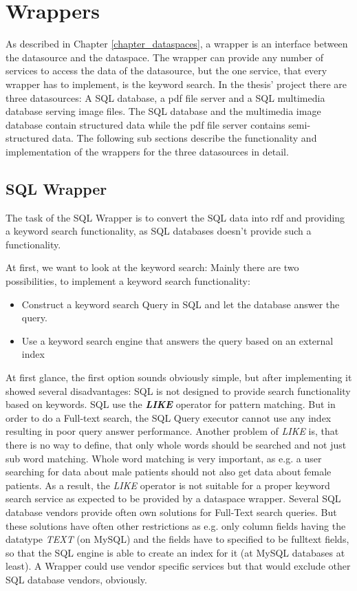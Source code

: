 \section{Wrappers}

As described in Chapter \ref{chapter_dataspaces}, a wrapper is  an interface between the datasource and the dataspace. The wrapper can provide any number of services to access the data of the datasource, but the one service, that every wrapper has to implement, is the keyword search.
In the thesis' project there are three datasources: A SQL database, a pdf file server and a SQL multimedia database serving image files. The SQL database and the multimedia image database contain
structured data while the pdf file server contains semi-structured data.
The following sub sections describe the functionality and implementation of the wrappers for the three datasources in detail.

\subsection{SQL Wrapper}

The task of the SQL Wrapper is to convert the SQL data into rdf and providing a keyword search functionality, as SQL databases doesn't provide such a functionality.

At first, we want to look at the keyword search:
Mainly there are two possibilities, to implement a keyword search functionality:
\begin{itemize}
	\item {Construct a keyword search Query in SQL and let the database answer the query.}
	
	\item {Use a keyword search engine that answers the query based on an external index}
\end{itemize}

At first glance, the first option sounds obviously simple, but after implementing it showed several disadvantages: SQL is not designed to provide search functionality based on keywords. SQL use the \textbf{\emph{LIKE}} operator for pattern matching. But in order to do a Full-text search, the SQL Query executor cannot use any index resulting in poor query answer performance. Another problem of \emph{LIKE} is, that there is no way to define, that only whole words should be searched and not just sub word matching. Whole word matching is very important, as e.g. a user searching for data about male patients should not also get data about female patients.
As a result, the \emph{LIKE} operator is not suitable for a proper keyword search service as expected to be provided by a dataspace wrapper. Several SQL database vendors provide often own solutions for Full-Text search queries. But these solutions have often other restrictions as e.g. only column fields having the datatype \emph{TEXT} (on MySQL) and the fields have to specified to be fulltext fields, so that the SQL engine is able to create an index for it (at MySQL databases at least).
A Wrapper could use vendor specific services but that would exclude other SQL database vendors, obviously. 

